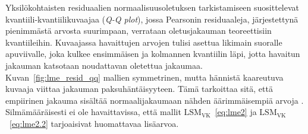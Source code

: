 \documentclass[finnish]{docopts}
\begin{document}
Yksilökohtaisten residuaalien normaalisuusoletuksen tarkistamiseen \cite{burzykowski13} suosittelevat kvantiili-kvantiilikuvaajaa (\textit{Q-Q plot}), jossa Pearsonin residuaaleja, järjestettynä pienimmästä arvosta suurimpaan, verrataan oletusjakauman teoreettisiin kvantiileihin. Kuvaajassa havaittujen arvojen tulisi asettua likimain suoralle apuviivalle, joka kulkee ensimmäisen ja kolmannen kvantiilin läpi, jotta havaitun jakauman katsotaan noudattavan oletettua jakaumaa.\\

Kuvan~\ref{fig:lme_resid_qq} mallien symmetrinen, mutta hännistä kaareutuva kuvaaja viittaa jakauman paksuhäntäisyyteen. Tämä tarkoittaa sitä, että empiirinen jakauma sisältää normaalijakaumaan nähden äärimmäisempiä arvoja \cite{pinheiro00}. Silmämääräisesti ei ole havaittavissa, että mallit $\text{LSM}_{\text{VK}}$~\ref{eq:lme2} ja $\text{LSM}_{\text{VK}}$~\ref{eq:lme2.2} tarjoaisivat huomattavaa lisäarvoa.\\
\end{document}
